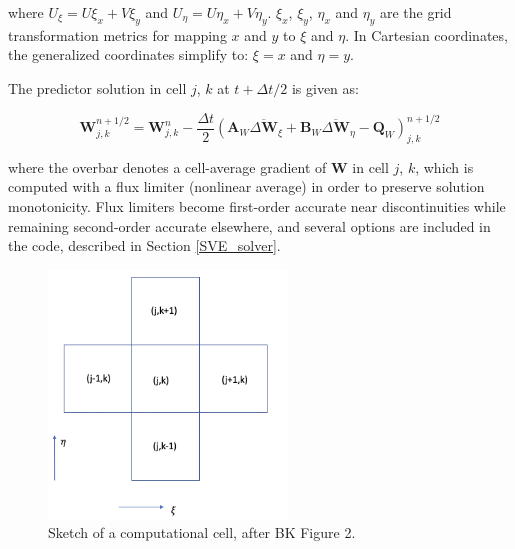 \documentclass{article}
\begin{document}
\noindent where $U_{\xi} = U \xi_x  + V \xi_y $ and $U_{\eta} = U \eta_x  + V \eta_y $.
$\xi_x$,  $\xi_y$,  $\eta_x$ and  $\eta_y$ are the grid transformation metrics for mapping $x$ and $y$ to $\xi$ and  $\eta$. In Cartesian coordinates, the generalized coordinates simplify to: $\xi  = x$ and  $\eta  = y$.

The predictor solution in cell $j$, $k$ at $t + \Delta t/2$  is given as:

 
\begin{equation}
\mathbf{W}_{j,k}^{n+1/2} = \mathbf{W}_{j,k}^{n}
- \frac{\Delta t}{2} (
	\mathbf{A}_W \overline{\Delta \mathbf{W}}_\xi+
	\mathbf{B}_W \overline{\Delta \mathbf{W}}_\eta-
	\mathbf{Q}_W)_{j,k}^{n+1/2}
\label{predictor}
\end{equation}


\noindent where the overbar denotes a cell-average gradient of $\mathbf{W}$ in cell $j$, $k$,  which is computed with a flux limiter (nonlinear average) in order to preserve solution monotonicity.  Flux limiters  become first-order accurate near discontinuities while remaining second-order accurate elsewhere, and several options are included in the code, described in Section \ref{SVE_solver}.

 \begin{figure}[h]
 \centering
\includegraphics[width=15pc]{grid/coords.png}
 \caption{Sketch of a computational cell, after BK Figure 2.}
 \label{coords}
 \end{figure}
  
\end{document}
